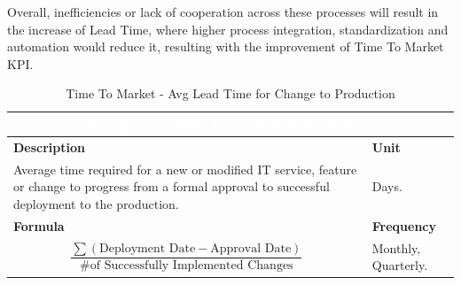 Overall, inefficiencies or lack of cooperation across these processes will result in the increase of Lead Time, where higher process integration, standardization and automation would reduce it, resulting with the improvement of Time To Market KPI.




\begin{table}[h]
    \centering
    \renewcommand{\arraystretch}{1.6}
    \setlength{\arrayrulewidth}{0.6pt}

    \begin{tabularx}{\textwidth}{|X|X|}
    \hline
    \multicolumn{2}{|c|}{\cellcolor{mcblue}\textcolor{white}{\textbf{Average Lead Time for Change to Production}}} \\ \hline

    \rowcolor{mclightgray}
    \textbf{Description} & \textbf{Unit} \\ \hline
    Average time required for a new or modified IT service, feature or change to progress from a formal approval to successful deployment to the production. &
    Days. \\ \hline

    \rowcolor{mclightgray}
    \textbf{Formula} & \textbf{Frequency} \\ \hline
    \[
       \frac{\sum (\text{Deployment Date} - \text{Approval Date})}{\text{\# of Successfully Implemented Changes}}
    \]
     &
    Monthly, Quarterly. \\ \hline

    \end{tabularx}

    \caption{Time To Market - Avg Lead Time for Change to Production}
    \label{tab:measurement_AverageLeadTimeforChangetoProduction}
\end{table}


